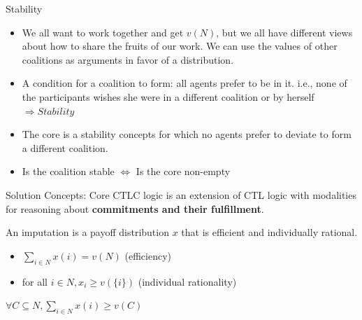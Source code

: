 \documentclass{beamer}
\begin{document}
\begin{frame}{Stability}
    \begin{itemize}
        \item We all want to work together and get $v(N)$, but we all have different views about how to share the fruits of our work. We can use the values of other coalitions as arguments in favor of a distribution.
        \item A condition for a coalition to form:
            {\color{red}all} agents prefer to be in it. i.e., none of the participants wishes she were in a different coalition or by herself {\color{red} $\Rightarrow Stability$ }
        \item The {\color{red} core} is a stability concepts for which no agents prefer to deviate to form a different coalition.
        \item Is the coalition stable $\Leftrightarrow$ Is the core non-empty
    \end{itemize}
\end{frame}
\begin{frame}{Solution Concepts: Core}
    CTLC logic is an extension of CTL logic with modalities for reasoning about \textbf{commitments and their fulfillment}.
    \begin{definition} [Imputation]\label{dfn:imputationbig}
        An {\color{red}imputation} is a payoff distribution $x$ that is efficient and individually rational.
        \begin{itemize}
            \item $\sum_{i \in N} x(i) = v(N)$ (efficiency)
            \item for all $i \in N, x_i \geq v(\{i\})$ (individual rationality)
        \end{itemize}
    \end{definition}

    \begin{definition} \label{dfn:grouprationality}
        $\forall C \subseteq N, \sum_{i \in N} x(i) \geq v(C)$
    \end{definition}
\end{frame}
\end{document}
